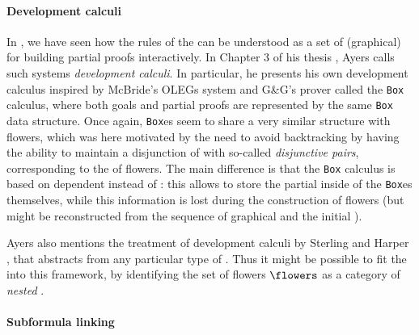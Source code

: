 \begin{scope}
\paragraph{Development calculi}

In , we have seen how the rules of the  can be understood as a set of (graphical)  for building
partial proofs interactively. In Chapter 3 of his thesis
, Ayers calls such systems \emph{development calculi}. In
particular, he presents his own development calculus inspired by McBride's OLEGs
system  and G\&G's prover
 called the \texttt{Box} calculus, where both
goals and partial proofs are represented by the same \texttt{Box} data
structure. Once again, \texttt{Box}es seem to share a very similar structure
with flowers, which was here motivated by the need to avoid backtracking by
having the ability to maintain a disjunction of  with so-called
\emph{disjunctive pairs}, corresponding to the  of flowers. The main
difference is that the \texttt{Box} calculus is based on dependent  instead of : this allows to store the partial
 inside of the \texttt{Box}es themselves, while this information
is lost during the construction of flowers (but might be reconstructed from the
sequence of graphical  and the initial ).

Ayers also mentions the  treatment of development
calculi by Sterling and Harper , that
abstracts from any particular type of . Thus it might be possible
to fit the  into this framework, by identifying the set of
flowers $\flowers$ as a category of \emph{nested }.

\paragraph{Subformula linking}


\end{scope}
